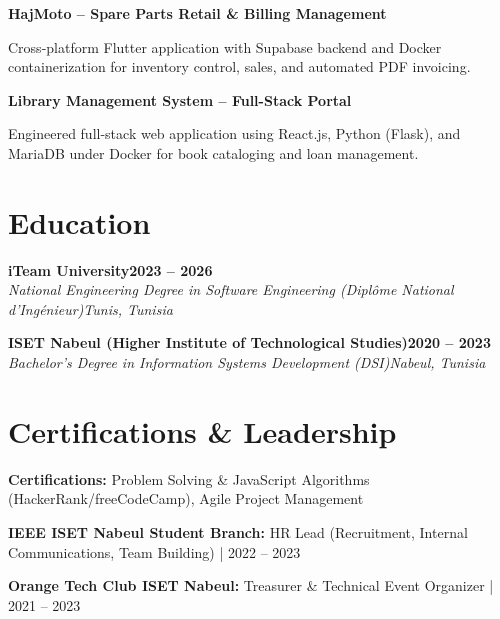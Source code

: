 \documentclass[letterpaper,10pt]{article}
\newcommand{\heading}[2]{\hspace{10pt}#1\hfill#2\\}
\newcommand{\headingBf}[2]{\heading{\textbf{#1}}{\textbf{#2}}}
\newcommand{\headingIt}[2]{\heading{\textit{#1}}{\textit{#2}}}
\newenvironment{resume_list}{
  \vspace{-7pt}
  \begin{itemize}[itemsep=-2pt, parsep=1pt, leftmargin=30pt]
}{
  \end{itemize}
}
\begin{document}
\headingBf{HajMoto -- Spare Parts Retail \& Billing Management}{}
\begin{resume_list}
  \item Cross-platform Flutter application with Supabase backend and Docker containerization for inventory control, sales, and automated PDF invoicing.
\end{resume_list}

\headingBf{Library Management System -- Full-Stack Portal}{}
\begin{resume_list}
  \item Engineered full-stack web application using React.js, Python (Flask), and MariaDB under Docker for book cataloging and loan management.
\end{resume_list}

\section{Education}

\headingBf{iTeam University}{2023 -- 2026}
\headingIt{National Engineering Degree in Software Engineering (Dipl\^ome National d'Ing\'enieur)}{Tunis, Tunisia}

\vspace{4pt}

\headingBf{ISET Nabeul (Higher Institute of Technological Studies)}{2020 -- 2023}
\headingIt{Bachelor's Degree in Information Systems Development (DSI)}{Nabeul, Tunisia}

\section{Certifications \& Leadership}
\begin{resume_list}
  \item \textbf{Certifications:} Problem Solving \& JavaScript Algorithms (HackerRank/freeCodeCamp), Agile Project Management
  \item \textbf{IEEE ISET Nabeul Student Branch:} HR Lead (Recruitment, Internal Communications, Team Building) | 2022 -- 2023
  \item \textbf{Orange Tech Club ISET Nabeul:} Treasurer \& Technical Event Organizer | 2021 -- 2023
\end{resume_list}

\end{document}
